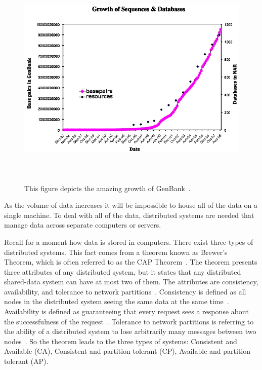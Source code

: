 \documentclass[12pt]{ucthesis}
\newcommand{\captionfonts}{\small\bf\ssp}
\begin{document}
\begin{figure}[H]
\begin{center}
\includegraphics[height=100mm]{genbank_nature_dot_com.jpg}
\captionfonts
\caption[Growth of data inside GenBank]{This figure depicts the amazing growth of GenBank~\cite{nature_graph}.}
\label{fig:genbank}
\end{center}
\end{figure}

As the volume of data increases it will be impossible to house all of the data on a single machine.
To deal with all of the data, distributed systems are needed that manage data across separate
computers or servers.


Recall for a moment how data is stored in computers. There exist three types of distributed systems. This fact comes from a theorem known as Brewer's Theorem, which is often referred to as the CAP Theorem~\cite{brewers_thm}. The theorem presents three attributes of any distributed system, but it states that any distributed shared-data system can have at most two of them. The attributes are consistency, availability, and tolerance to network partitions~\cite{brewers_thm}. Consistency is defined as all nodes in the distributed system seeing the same data at the same time~\cite{brewers_conjecture}. Availability is defined as guaranteeing that every request sees a response about the successfulness of the request~\cite{brewers_conjecture}. Tolerance to network partitions is referring to the ability of a distributed system to lose arbitrarily many messages between two nodes~\cite{brewers_conjecture}. So the theorem leads to the three types of systems: Consistent and Available (CA), Consistent and partition tolerant (CP), Available and partition tolerant (AP). 
\end{document}
